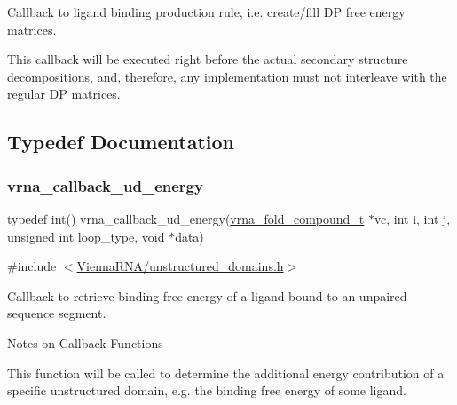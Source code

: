 Callback to ligand binding production rule, i.\+e. create/fill DP free energy matrices. 

This callback will be executed right before the actual secondary structure decompositions, and, therefore, any implementation must not interleave with the regular DP matrices. 

\subsection{Typedef Documentation}
\mbox{\label{group__domains__up_ga75825c57d0bfde4ae4f95c044260c5c3}} 
\subsubsection{\texorpdfstring{vrna\_callback\_ud\_energy}{vrna\_callback\_ud\_energy}}
{\footnotesize\ttfamily typedef int() vrna\+\_\+callback\+\_\+ud\+\_\+energy(\mbox{\hyperlink{group__fold__compound_ga1b0cef17fd40466cef5968eaeeff6166}{vrna\+\_\+fold\+\_\+compound\+\_\+t}} $\ast$vc, int i, int j, unsigned int loop\+\_\+type, void $\ast$data)}



{\ttfamily \#include $<$\mbox{\hyperlink{unstructured__domains_8h}{Vienna\+R\+N\+A/unstructured\+\_\+domains.\+h}}$>$}



Callback to retrieve binding free energy of a ligand bound to an unpaired sequence segment. 

\begin{DoxyRefDesc}{Notes on Callback Functions}
\item[\mbox{\hyperlink{callbacks__callbacks000007}{Notes on Callback Functions}}]This function will be called to determine the additional energy contribution of a specific unstructured domain, e.\+g. the binding free energy of some ligand. \end{DoxyRefDesc}



